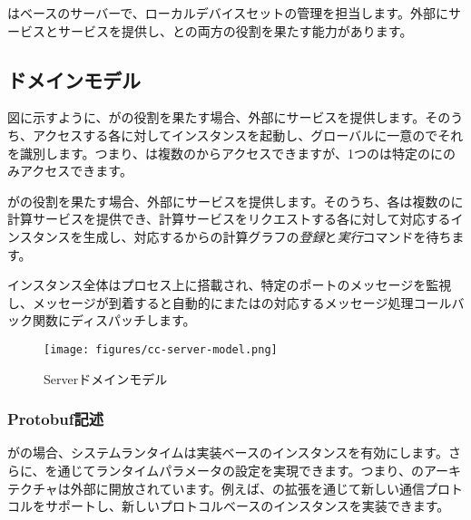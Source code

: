 \begin{content}

はベースのサーバーで、ローカルデバイスセットの管理を担当します。外部にサービスとサービスを提供し、との両方の役割を果たす能力があります。

\subsection{ドメインモデル}

図に示すように、がの役割を果たす場合、外部にサービスを提供します。そのうち、アクセスする各に対してインスタンスを起動し、グローバルに一意のでそれを識別します。つまり、は複数のからアクセスできますが、1つのは特定のにのみアクセスできます。

がの役割を果たす場合、外部にサービスを提供します。そのうち、各は複数のに計算サービスを提供でき、計算サービスをリクエストする各に対して対応するインスタンスを生成し、対応するからの計算グラフの\emph{登録}と\emph{実行}コマンドを待ちます。

インスタンス全体はプロセス上に搭載され、特定のポートのメッセージを監視し、メッセージが到着すると自動的にまたはの対応するメッセージ処理コールバック関数にディスパッチします。

\begin{figure}[H]
\centering
\texttt{[image: figures/cc-server-model.png]}
\caption{Serverドメインモデル}
 \label{fig:cc-server-model}
\end{figure}

\subsubsection{Protobuf記述}

がの場合、システムランタイムは実装ベースのインスタンスを有効にします。さらに、を通じてランタイムパラメータの設定を実現できます。つまり、\tf{}のアーキテクチャは外部に開放されています。例えば、の拡張を通じて新しい通信プロトコルをサポートし、新しいプロトコルベースのインスタンスを実装できます。


\end{content}
